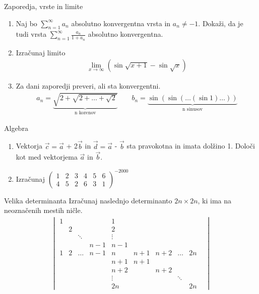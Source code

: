 \begin{frame}{Zaporedja, vrste in limite}
	\begin{enumerate}
		\item 
		Naj bo $\sum_{n=1}^\infty a_n$  absolutno konvergentna vrsta in $a_n \ne -1$.
		Dokaži, da je tudi vrsta $\sum_{n=1}^\infty \frac{a_n}{1+a_n}$
		absolutno konvergentna.

		\item
		Izračunaj limito
		\begin{align*}
			\lim\limits_{x \to \infty}(\sin {\sqrt{x+1}} - \sin {\sqrt{x}})
		\end{align*}

		\item
		Za dani zaporedji preveri, ali sta konvergentni.
		\begin{align*}
			a_n = \underbrace{\sqrt{2+\sqrt{2+\dots+\sqrt{2}}}}_\text{n korenov} \qquad
			b_n = \underbrace{\sin(\sin(\dots(\sin 1)\dots))}_\text{n sinusov}
		\end{align*}
	\end{enumerate}
\end{frame}

\begin{frame}{Algebra}
	\begin{enumerate}
		\item
		Vektorja $\vec{c} = \vec{a}$ + 2$\vec{b}$ in $\vec{d} = \vec{a}$ - $\vec{b}$
		sta pravokotna in imata dolžino 1. Določi kot med vektorjema $\vec{a}$ in $\vec{b}$.
		\item 
		Izračunaj
		$\begin{pmatrix}
			1 & 2 & 3 & 4 & 5 & 6 \\
			4 & 5 & 2 & 6 & 3 & 1
		\end{pmatrix}^{-2000}$
	\end{enumerate}
\end{frame}

\begin{frame}{Velika determinanta}
	Izračunaj naslednjo determinanto $2n \times 2n$, ki ima na neoznačenih mestih ničle.
	\begin{align*}
		\begin{vmatrix}
			1 & & & & 1 & & & & & \\
			& 2 & & & 2 & & & & & \\
			& & \ddots & & \vdots & & & & & \\
			& & & n-1 & n-1 & & & & & \\
			1 & 2 & \dots & n-1 & n & n+1 & n+2 & \dots & 2n \\
			& & & & n+1 & n+1 & & & & \\
			& & & & n+2 & & n+2 & & & \\
			& & & & \vdots & & & \ddots & \\
			& & & & 2n & & & & 2n 
		\end{vmatrix}
	\end{align*}
\end{frame}


